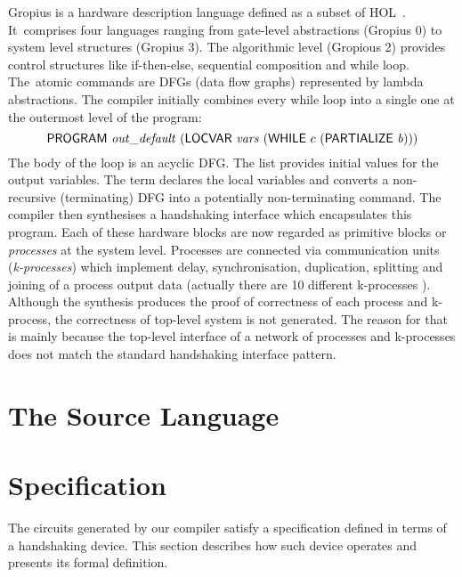 \documentclass{llncs}
\begin{document}
Gropius is a hardware description language
defined as a subset of HOL~\mbox{\cite{Blu01,Gropius1,BS99,Gropius2}}.
It~comprises four languages ranging
from gate-level abstractions (Gropius 0) to 
system level structures (Gropius 3).
The algorithmic level (Gropious 2)
provides control structures like if-then-else,
sequential composition and while loop.
The~atomic commands are DFGs (data flow
graphs) represented by lambda abstractions.
The compiler initially combines every while loop into
a single one at the outermost level of the
program:
\[
\DEF{PROGRAM}\ \VAR{out\_default}\ (\DEF{LOCVAR}\ \VAR{vars}\ 
(\DEF{WHILE}\ c\ (\DEF{PARTIALIZE}\ \VAR{b})))
\]
The body  of the  loop is an acyclic %
DFG. The list \VAR{out\_default}
provides initial values for the output variables.
The term  declares the local variables
 and  converts a
non-recursive (terminating) DFG into a potentially
non-terminating command.
The compiler then synthesises a handshaking
interface which encapsulates this program.
Each of these hardware blocks are now regarded
as primitive blocks or {\em processes\/} at the system level.
Processes are connected via communication
units ({\em k-processes\/}) which implement delay,
synchronisation, duplication,
splitting and joining of a process output data
(actually there  are 10 different k-processes \cite{Blu01}).
Although the synthesis produces the proof of
correctness of each process and k-process,
the correctness of top-level system is not generated.
The reason for that is mainly because
the top-level interface of a network of processes and 
k-processes does not match the standard handshaking
interface pattern.





\section{The Source Language}
\label{secTheSourceLanguage}


\section{Specification}
\label{secSpecification}
The circuits generated by our compiler satisfy
a specification defined in terms of a handshaking device.
This section describes how such device operates and 
presents its formal definition.
\end{document}
